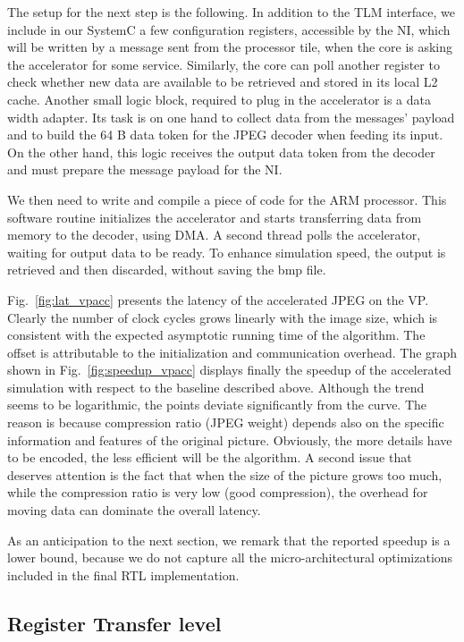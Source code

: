 \documentclass{acm_proc_article-sp}
\begin{document}
The setup for the next step is the following.
In addition to the TLM interface, we include in our SystemC a few configuration registers,
accessible by the NI, which will be written by a message sent from the processor
tile, when the core is asking the accelerator for some service.
Similarly, the core can poll another register to check whether new data are available
to be retrieved and stored in its local L2 cache.
Another small logic block, required to plug in the accelerator is a data width adapter.
Its task is on one hand to collect data from the messages' payload and to build the 64
B data token for the JPEG decoder when feeding its input. On the other hand, this logic
receives the output data token from the decoder and must prepare the message payload for
the NI.

We then need to write and compile a piece of code for the ARM processor.
This software routine initializes the accelerator and starts transferring
data from memory to the decoder, using DMA. A second thread polls the
accelerator, waiting for output data to be ready.
To enhance simulation speed, the output is retrieved and then discarded,
without saving the bmp file.

Fig.~\ref{fig:lat_vpacc} presents the latency of the accelerated JPEG on the VP.
Clearly the number of clock cycles grows linearly with the image size, which is
consistent with the expected asymptotic running time of the algorithm.
The offset is attributable to the initialization and communication overhead.
The graph shown in Fig.~\ref{fig:speedup_vpacc} displays finally the speedup
of the accelerated simulation with respect to the baseline described above.
Although the trend seems to be logarithmic, the points deviate significantly
from the curve. The reason is because compression ratio (JPEG weight) depends
also on the specific information and features of the original picture.
Obviously, the more details have to be encoded, the less efficient will be 
the algorithm.
A second issue that deserves attention is the fact that when the size of the
picture grows too much, while the compression ratio is very low (good compression),
the overhead for moving data can dominate the overall latency.

As an anticipation to the next section, we remark that the reported speedup
is a lower bound, because we do not capture all the micro-architectural optimizations
included in the final RTL implementation.



\subsection{Register Transfer level}
\end{document}
